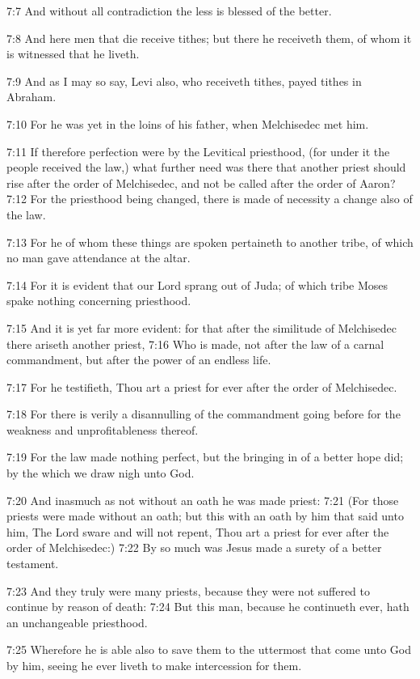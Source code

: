 7:7 And without all contradiction the less is blessed of the better.

7:8 And here men that die receive tithes; but there he receiveth them,
of whom it is witnessed that he liveth.

7:9 And as I may so say, Levi also, who receiveth tithes, payed tithes
in Abraham.

7:10 For he was yet in the loins of his father, when Melchisedec met
him.

7:11 If therefore perfection were by the Levitical priesthood, (for
under it the people received the law,) what further need was there
that another priest should rise after the order of Melchisedec, and
not be called after the order of Aaron?  7:12 For the priesthood being
changed, there is made of necessity a change also of the law.

7:13 For he of whom these things are spoken pertaineth to another
tribe, of which no man gave attendance at the altar.

7:14 For it is evident that our Lord sprang out of Juda; of which
tribe Moses spake nothing concerning priesthood.

7:15 And it is yet far more evident: for that after the similitude of
Melchisedec there ariseth another priest, 7:16 Who is made, not after
the law of a carnal commandment, but after the power of an endless
life.

7:17 For he testifieth, Thou art a priest for ever after the order of
Melchisedec.

7:18 For there is verily a disannulling of the commandment going
before for the weakness and unprofitableness thereof.

7:19 For the law made nothing perfect, but the bringing in of a better
hope did; by the which we draw nigh unto God.

7:20 And inasmuch as not without an oath he was made priest: 7:21 (For
those priests were made without an oath; but this with an oath by him
that said unto him, The Lord sware and will not repent, Thou art a
priest for ever after the order of Melchisedec:) 7:22 By so much was
Jesus made a surety of a better testament.

7:23 And they truly were many priests, because they were not suffered
to continue by reason of death: 7:24 But this man, because he
continueth ever, hath an unchangeable priesthood.

7:25 Wherefore he is able also to save them to the uttermost that come
unto God by him, seeing he ever liveth to make intercession for them.

